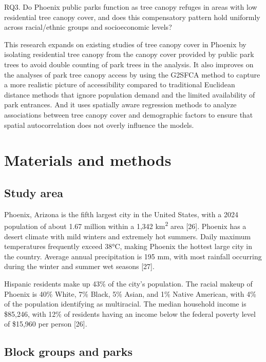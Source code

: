 \documentclass[
  sn-basic,
]{sn-jnl}
\begin{document}
RQ3. Do Phoenix public parks function as tree canopy refuges in areas
with low residential tree canopy cover, and does this compensatory
pattern hold uniformly across racial/ethnic groups and socioeconomic
levels?

This research expands on existing studies of tree canopy cover in
Phoenix by isolating residential tree canopy from the canopy cover
provided by public park trees to avoid double counting of park trees in
the analysis. It also improves on the analyses of park tree canopy
access by using the G2SFCA method to capture a more realistic picture of
accessibility compared to traditional Euclidean distance methods that
ignore population demand and the limited availability of park entrances.
And it uses spatially aware regression methods to analyze associations
between tree canopy cover and demographic factors to ensure that spatial
autocorrelation does not overly influence the models.

\section{Materials and methods}\label{sec-methods}

\subsection{Study area}\label{study-area}

Phoenix, Arizona is the fifth largest city in the United States, with a
2024 population of about 1.67 million within a 1,342
km\textsuperscript{2} area {[}26{]}. Phoenix has a desert climate with
mild winters and extremely hot summers. Daily maximum temperatures
frequently exceed 38°C, making Phoenix the hottest large city in the
country. Average annual precipitation is 195 mm, with most rainfall
occurring during the winter and summer wet seasons {[}27{]}.

Hispanic residents make up 43\% of the city's population. The racial
makeup of Phoenix is 40\% White, 7\% Black, 5\% Asian, and 1\% Native
American, with 4\% of the population identifying as multiracial. The
median household income is \$85,246, with 12\% of residents having an
income below the federal poverty level of \$15,960 per person {[}26{]}.

\subsection{Block groups and parks}\label{block-groups-and-parks}
\end{document}
